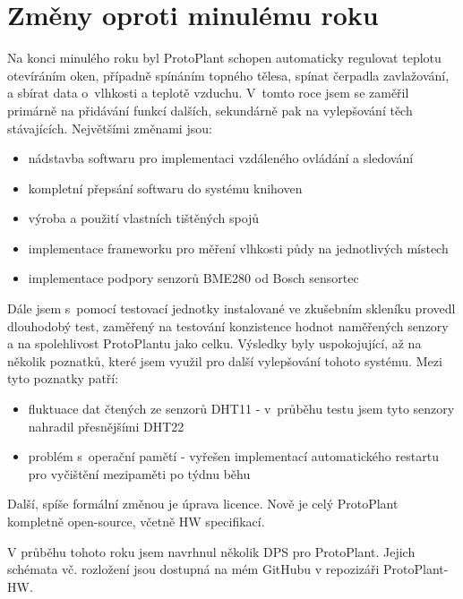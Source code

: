 \chapter{Změny oproti minulému roku}
Na konci minulého roku byl ProtoPlant schopen automaticky regulovat teplotu otevíráním oken, případně spínáním topného tělesa, spínat čerpadla zavlažování, a sbírat data o~vlhkosti a teplotě vzduchu. V~tomto roce jsem se zaměřil primárně na přidávání funkcí dalších, sekundárně pak na vylepšování těch stávajících.
Největšími změnami jsou: 
\begin{itemize}
    \item nádstavba softwaru pro implementaci vzdáleného ovládání a sledování
	\item kompletní přepsání softwaru do systému knihoven
	\item výroba a použití vlastních tištěných spojů
	\item implementace frameworku pro měření vlhkosti půdy na jednotlivých místech
	\item implementace podpory senzorů BME280 od Bosch sensortec
\end{itemize}

Dále jsem s~pomocí testovací jednotky instalované ve zkušebním skleníku provedl dlouhodobý test, zaměřený na testování konzistence hodnot naměřených senzory a na spolehlivost ProtoPlantu jako celku. Výsledky byly uspokojující, až na několik poznatků, které jsem využil pro další vylepšování tohoto systému. Mezi tyto poznatky patří:
\begin{itemize}
    \item fluktuace dat čtených ze senzorů DHT11 - v~průběhu testu jsem tyto senzory nahradil přesnějšími DHT22
    \item problém s~operační pamětí - vyřešen implementací automatického restartu pro vyčištění mezipaměti po týdnu běhu
\end{itemize}

Další, spíše formální změnou je úprava licence. Nově je celý ProtoPlant kompletně open-source, včetně HW specifikací.

V průběhu tohoto roku jsem navrhnul několik DPS pro ProtoPlant. 
Jejich schémata vč. rozložení jsou dostupná na mém GitHubu v repozizáři ProtoPlant-HW. 
\newpage

